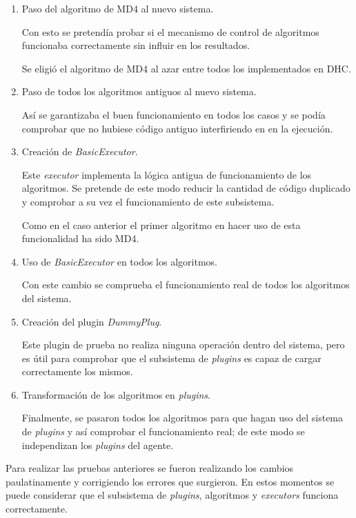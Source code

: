 \begin{enumerate}
	\item Paso del algoritmo de MD4 al nuevo sistema.
	
	Con esto se pretendía probar si el mecanismo de control de algoritmos funcionaba correctamente sin influir en los resultados.
	
	Se eligió el algoritmo de MD4 al azar entre todos los implementados en DHC.
	
	\item Paso de todos los algoritmos antiguos al nuevo sistema.
	
	Así se garantizaba el buen funcionamiento en todos los casos y se podía comprobar que no hubiese código antiguo interfiriendo en en la ejecución.
	
	\item Creación de \emph{BasicExecutor}.
	
	Este \emph{executor} implementa la lógica antigua de funcionamiento de los algoritmos. Se pretende de este modo reducir la cantidad de código duplicado y comprobar a su vez el funcionamiento de este subsistema.
	
	Como en el caso anterior el primer algoritmo en hacer uso de esta funcionalidad ha sido MD4.
	
	\item Uso de \emph{BasicExecutor} en todos los algoritmos.
	
	Con este cambio se comprueba el funcionamiento real de todos los algoritmos del sistema.
	
	\item Creación del plugin \emph{DummyPlug}.
	
	Este plugin de prueba no realiza ninguna operación dentro del sistema, pero es útil para comprobar que el subsistema de \emph{plugins} es capaz de cargar correctamente los mismos.
	
	\item Transformación de los algoritmos en \emph{plugins}.
	
	Finalmente, se pasaron todos los algoritmos para que hagan uso del sistema de \emph{plugins} y así comprobar el funcionamiento real; de este modo se independizan los \emph{plugins} del agente.
\end{enumerate}

Para realizar las pruebas anteriores se fueron realizando los cambios paulatinamente y corrigiendo los errores que surgieron. En estos momentos se puede considerar que el subsistema de \emph{plugins}, algoritmos y \emph{executors} funciona correctamente.

